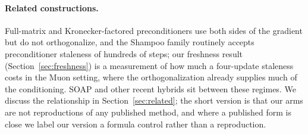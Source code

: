 \paragraph{Related constructions.}
Full-matrix and Kronecker-factored preconditioners
\citep{martens2015kfac,gupta2018shampoo,anil2020scalable} use both sides of the
gradient but do not orthogonalize, and the Shampoo family routinely accepts
preconditioner staleness of hundreds of steps; our freshness result
(Section~\ref{sec:freshness}) is a measurement of how much a four-update
staleness costs in the Muon setting, where the orthogonalization already
supplies much of the conditioning. SOAP \citep{vyas2024soap} and other recent
hybrids sit between these regimes. We discuss the relationship in
Section~\ref{sec:related}; the short version is that our arms are not
reproductions of any published method, and where a published form is close we
label our version a formula control rather than a reproduction.
